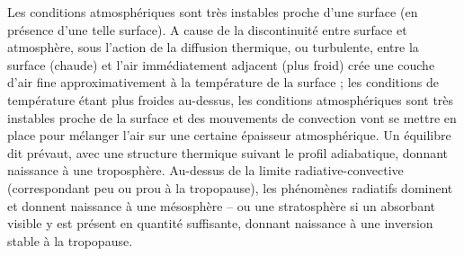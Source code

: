 \sk
Les conditions atmosphériques sont très instables proche d'une surface (en présence d'une telle surface). A cause de la discontinuité entre surface et atmosphère, sous l'action de la diffusion thermique, ou turbulente, entre la surface (chaude) et l'air immédiatement adjacent (plus froid) crée une couche d'air fine approximativement à la température de la surface ; les conditions de température étant plus froides au-dessus, les conditions atmosphériques sont très instables proche de la surface et des mouvements de convection vont se mettre en place pour mélanger l'air sur une certaine épaisseur atmosphérique. Un équilibre dit  prévaut, avec une structure thermique suivant le profil adiabatique, donnant naissance à une troposphère. Au-dessus de la limite radiative-convective (correspondant peu ou prou à la tropopause), les phénomènes radiatifs dominent et donnent naissance à une mésosphère -- ou une stratosphère si un absorbant visible y est présent en quantité suffisante, donnant naissance à une inversion stable à la tropopause.






